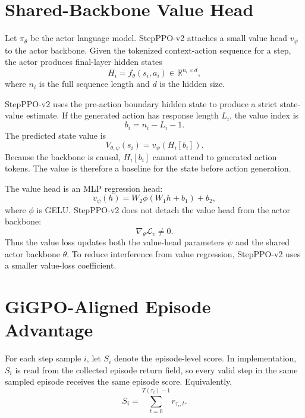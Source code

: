 \documentclass[10pt]{article}
\begin{document}
\section{Shared-Backbone Value Head}
Let $\pi_\theta$ be the actor language model. StepPPO-v2 attaches a small value head $v_\psi$ to the actor backbone. Given the tokenized context-action sequence for a step, the actor produces final-layer hidden states
\begin{equation}
H_i=f_\theta(s_i,a_i)\in\mathbb{R}^{n_i\times d},
\end{equation}
where $n_i$ is the full sequence length and $d$ is the hidden size.

StepPPO-v2 uses the pre-action boundary hidden state to produce a strict state-value estimate. If the generated action has response length $L_i$, the value index is
\begin{equation}
b_i=n_i-L_i-1.
\end{equation}
The predicted state value is
\begin{equation}
V_{\theta,\psi}(s_i)=v_\psi(H_i[b_i]).
\end{equation}
Because the backbone is causal, $H_i[b_i]$ cannot attend to generated action tokens. The value is therefore a baseline for the state before action generation.

The value head is an MLP regression head:
\begin{equation}
v_\psi(h)=W_2\phi(W_1h+b_1)+b_2,
\end{equation}
where $\phi$ is GELU. StepPPO-v2 does not detach the value head from the actor backbone:
\begin{equation}
\nabla_\theta \mathcal L_v \neq 0.
\end{equation}
Thus the value loss updates both the value-head parameters $\psi$ and the shared actor backbone $\theta$. To reduce interference from value regression, StepPPO-v2 uses a smaller value-loss coefficient.

\section{GiGPO-Aligned Episode Advantage}
For each step sample $i$, let $S_i$ denote the episode-level score. In implementation, $S_i$ is read from the collected episode return field, so every valid step in the same sampled episode receives the same episode score. Equivalently,
\begin{equation}
S_i=\sum_{t=0}^{T(\tau_i)-1}r_{\tau_i,t}.
\end{equation}
\end{document}
